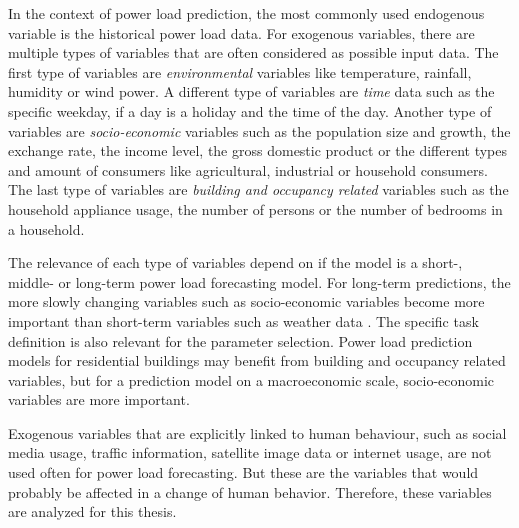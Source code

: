 In the context of power load prediction, the most commonly 
used endogenous variable is the historical power load data.
For exogenous variables, there are multiple types of 
variables that are often considered as possible input data.
The first type of variables are \textit{environmental} variables like temperature, 
rainfall, humidity or wind power. A different type of variables are \textit{time} data
such as the specific weekday, if a day is a holiday and the time of the day.
Another type of variables are \textit{socio-economic} variables such as the
population size and growth, the exchange rate, the income level,
the gross domestic product or the different types and amount 
of consumers like agricultural, industrial or household consumers.
The last type of variables are \textit{building and occupancy related} variables such
as the household appliance usage,
the number of persons or the number of bedrooms in a household.

The relevance of each type of variables depend on if the model is
a short-, middle- or long-term power load forecasting model. For 
long-term predictions, the more slowly changing variables such as socio-economic
variables become more important than short-term variables such as weather data 
\cite{loadforecastingtimedependency2}\cite{loadforecastingtimedependency}.
The specific task definition is also relevant for the parameter selection.
Power load prediction models for residential buildings may benefit from 
building and occupancy related variables, but for a prediction model on a 
macroeconomic scale, socio-economic variables are more important.

Exogenous variables that are explicitly linked to human behaviour, 
such as social media usage, traffic information, satellite image data or 
internet usage, are not used often for power load forecasting. 
But these are the variables that would probably be affected in a change of 
human behavior. Therefore, these variables are analyzed for this thesis.

